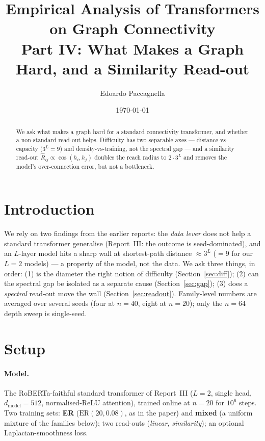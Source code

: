 \documentclass[11pt,a4paper]{article}
\title{Empirical Analysis of Transformers on Graph Connectivity \\
       \large Part IV: What Makes a Graph Hard, and a Similarity Read-out}
\author{Edoardo Paccagnella}
\date{\today}
\begin{document}
\maketitle

\begin{abstract}
\noindent We ask what makes a graph hard for a standard connectivity transformer, and
whether a non-standard read-out helps. Difficulty has two separable axes ---
distance-vs-capacity ($3^L=9$) and density-vs-training, not the spectral gap --- and a
similarity read-out $\hat R_{ij}\propto\cos(h_i,h_j)$ doubles the reach radius to
$2\cdot 3^L$ and removes the model's over-connection error, but not a bottleneck.
\end{abstract}

\section{Introduction}
\label{sec:intro}

We rely on two findings from the earlier reports: the \emph{data lever} does not help
a standard transformer generalise (Report~III: the outcome is seed-dominated), and an
$L$-layer model hits a sharp wall at shortest-path distance $\approx 3^L$ ($=9$ for our
$L=2$ models) --- a property of the model, not the data. We ask three things, in order:
(1) is the diameter the right notion of difficulty (Section~\ref{sec:diff}); (2) can the
spectral gap be isolated as a separate cause (Section~\ref{sec:gap}); (3) does a
\emph{spectral} read-out move the wall (Section~\ref{sec:readout}). Family-level numbers
are averaged over several seeds (four at $n=40$, eight at $n=20$); only the $n=64$ depth
sweep is single-seed.

\section{Setup}
\label{sec:setup}

\paragraph{Model.} The RoBERTa-faithful standard transformer of Report~III ($L=2$, single
head, $d_{\mathrm{model}}=512$, normalised-ReLU attention), trained online at $n=20$ for
$10^6$ steps. Two training sets: \textbf{ER} ($\mathrm{ER}(20,0.08)$, as in the paper) and
\textbf{mixed} (a uniform mixture of the families below); two read-outs (\emph{linear},
\emph{similarity}); an optional Laplacian-smoothness loss.
\end{document}
